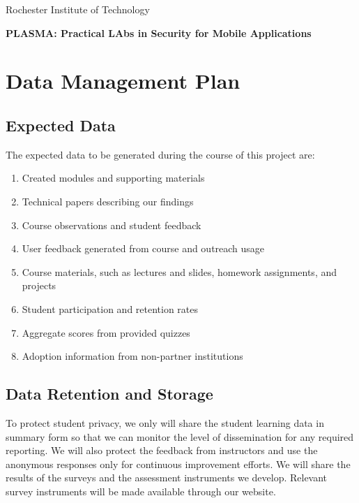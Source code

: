 \documentclass[11pt]{article}
\begin{document}
\renewcommand{\thepage}{DMP-\arabic{page}}
\setcounter{page}{1}

\def\myskip{3ex}

\centerline{\normalsize Rochester Institute of Technology}
\vspace{4 mm}
\centerline{\Large\bf PLASMA: Practical LAbs in Security for Mobile Applications}


\section*{Data Management Plan}


\subsection*{Expected Data}

The expected data to be generated during the course of this project are:

\begin{enumerate}
   \setlength{\itemsep}{.8pt}
    \setlength{\parskip}{0pt}
    \setlength{\parsep}{0pt}


  \item Created modules and supporting materials
  \item Technical papers describing our findings
  \item Course observations and student feedback
  \item User feedback generated from course and outreach usage
  \item Course materials, such as lectures and slides, homework assignments, and projects
  \item Student participation and retention rates
  \item Aggregate scores from provided quizzes
  \item Adoption information from non-partner institutions

\end{enumerate}

\subsection*{Data Retention and Storage}
To protect student privacy, we only will share the student learning data in summary form so that we can monitor the level of dissemination for any required reporting. We will also protect the feedback from instructors and use the anonymous responses only for continuous improvement efforts. We will share the results of the surveys and the assessment instruments we develop. Relevant survey instruments will be made available through our website.
\end{document}
